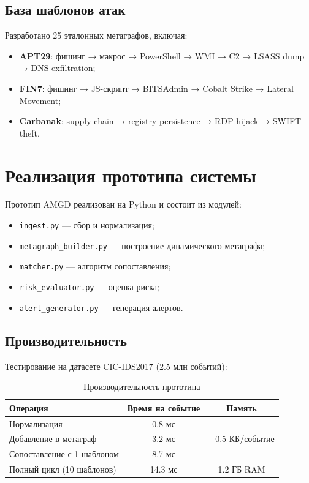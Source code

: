 \subsection{База шаблонов атак}

Разработано 25 эталонных метаграфов, включая:

\begin{itemize}
    \item \textbf{APT29}: фишинг → макрос → PowerShell → WMI → C2 → LSASS dump → DNS exfiltration;
    \item \textbf{FIN7}: фишинг → JS-скрипт → BITSAdmin → Cobalt Strike → Lateral Movement;
    \item \textbf{Carbanak}: supply chain → registry persistence → RDP hijack → SWIFT theft.
\end{itemize}
\section{Реализация прототипа системы}\label{sec:ch4/sect2}

Прототип AMGD реализован на Python и состоит из модулей:

\begin{itemize}
    \item \texttt{ingest.py} — сбор и нормализация;
    \item \texttt{metagraph\_builder.py} — построение динамического метаграфа;
    \item \texttt{matcher.py} — алгоритм сопоставления;
    \item \texttt{risk\_evaluator.py} — оценка риска;
    \item \texttt{alert\_generator.py} — генерация алертов.
\end{itemize}

\subsection{Производительность}

Тестирование на датасете CIC-IDS2017 (2.5 млн событий):

\begin{table}[h]
    \centering
    \caption{Производительность прототипа}
    \label{tab:performance}
    \begin{tabular}{lcc}
        \toprule
        Операция                   & Время на событие & Память          \\
        \midrule
        Нормализация               & 0.8 мс           & —               \\
        Добавление в метаграф      & 3.2 мс           & +0.5 КБ/событие \\
        Сопоставление с 1 шаблоном & 8.7 мс           & —               \\
        Полный цикл (10 шаблонов)  & 14.3 мс          & 1.2 ГБ RAM      \\
        \bottomrule
    \end{tabular}
\end{table}

